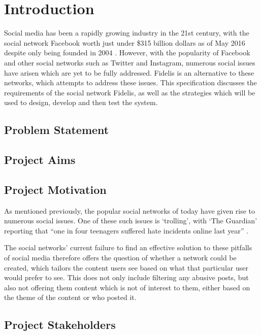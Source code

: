 \chapter{Introduction}
\label{Chapter:Introduction}

Social media has been a rapidly growing industry in the 21st century, with the social network Facebook worth just under \$315 billion dollars as of May 2016 despite only being founded in 2004 \cite{Forbes:Facebook}. However, with the popularity of Facebook and other social networks such as Twitter and Instagram, numerous social issues have arisen which are yet to be fully addressed. Fidelis is an alternative to these networks, which attempts to address these issues. This specification discusses the requirements of the social network Fidelis, as well as the strategies which will be used to design, develop and then test the system.

\section{Problem Statement}

\section{Project Aims}

\section{Project Motivation}
As mentioned previously, the popular social networks of today have given rise to numerous social issues. One of these such issues is `trolling', with `The Guardian' reporting that ``one in four teenagers suffered hate incidents online last year'' \cite{Gani:Trolling}. 

The social networks' current failure to find an effective solution to these pitfalls of social media therefore offers the question of whether a network could be created, which tailors the content users see based on what that particular user would prefer to see. This does not only include filtering any abusive posts, but also not offering them content which is not of interest to them, either based on the theme of the content or who posted it.

\section{Project Stakeholders}

